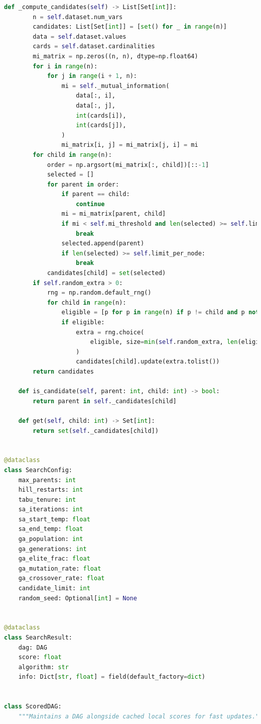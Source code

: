 \documentclass[twoside,11pt]{article}
\begin{document}
\begin{algorithm}
\begin{lstlisting}[language=Python]
    def _compute_candidates(self) -> List[Set[int]]:
        n = self.dataset.num_vars
        candidates: List[Set[int]] = [set() for _ in range(n)]
        data = self.dataset.values
        cards = self.dataset.cardinalities
        mi_matrix = np.zeros((n, n), dtype=np.float64)
        for i in range(n):
            for j in range(i + 1, n):
                mi = self._mutual_information(
                    data[:, i],
                    data[:, j],
                    int(cards[i]),
                    int(cards[j]),
                )
                mi_matrix[i, j] = mi_matrix[j, i] = mi
        for child in range(n):
            order = np.argsort(mi_matrix[:, child])[::-1]
            selected = []
            for parent in order:
                if parent == child:
                    continue
                mi = mi_matrix[parent, child]
                if mi < self.mi_threshold and len(selected) >= self.limit_per_node:
                    break
                selected.append(parent)
                if len(selected) >= self.limit_per_node:
                    break
            candidates[child] = set(selected)
        if self.random_extra > 0:
            rng = np.random.default_rng()
            for child in range(n):
                eligible = [p for p in range(n) if p != child and p not in candidates[child]]
                if eligible:
                    extra = rng.choice(
                        eligible, size=min(self.random_extra, len(eligible)), replace=False
                    )
                    candidates[child].update(extra.tolist())
        return candidates

    def is_candidate(self, parent: int, child: int) -> bool:
        return parent in self._candidates[child]

    def get(self, child: int) -> Set[int]:
        return set(self._candidates[child])


@dataclass
class SearchConfig:
    max_parents: int
    hill_restarts: int
    tabu_tenure: int
    sa_iterations: int
    sa_start_temp: float
    sa_end_temp: float
    ga_population: int
    ga_generations: int
    ga_elite_frac: float
    ga_mutation_rate: float
    ga_crossover_rate: float
    candidate_limit: int
    random_seed: Optional[int] = None


@dataclass
class SearchResult:
    dag: DAG
    score: float
    algorithm: str
    info: Dict[str, float] = field(default_factory=dict)


class ScoredDAG:
    """Maintains a DAG alongside cached local scores for fast updates."""


\end{lstlisting}
\end{algorithm}
\end{document}
